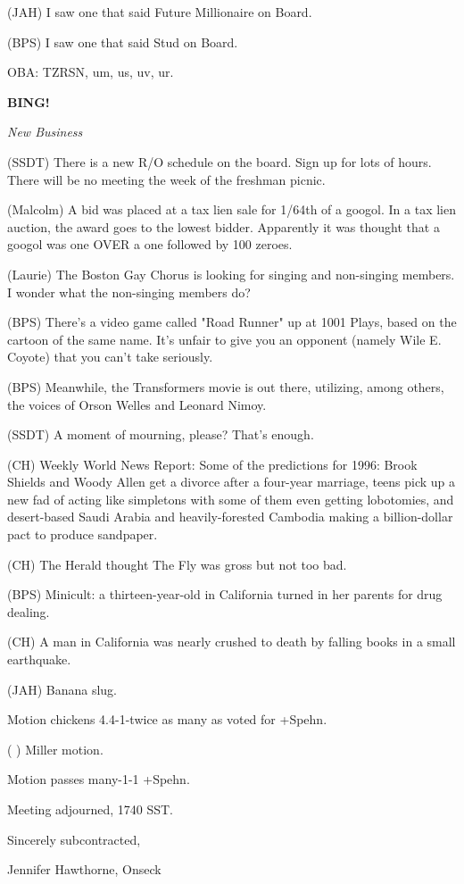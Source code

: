 \documentclass[12pt]{article}
\newcommand{\bing}{{\bf BING!} }
\newcommand{\goto}[1]{\bing \vskip 12pt \centerline{{\em{#1}}}}
\begin{document}
(JAH) I saw one that said Future Millionaire on Board.

(BPS) I saw one that said Stud on Board.

OBA: TZRSN, um, us, uv, ur.

\goto{New Business}

(SSDT) There is a new R/O schedule on the board. Sign up for lots of hours. There will be no meeting the week of the freshman picnic.

(Malcolm) A bid was placed at a tax lien sale for 1/64th of a googol. In a tax lien auction, the award goes to the lowest bidder. Apparently it was thought that a googol was one OVER a one followed by 100 zeroes.

(Laurie) The Boston Gay Chorus is looking for singing and non-singing members. I wonder what the non-singing members do?

(BPS) There's a video game called "Road Runner" up at 1001 Plays, based on the cartoon of the same name. It's unfair to give you an opponent (namely Wile E. Coyote) that you can't take seriously.

(BPS) Meanwhile, the Transformers movie is out there, utilizing, among others, the voices of Orson Welles and Leonard Nimoy.

(SSDT) A moment of mourning, please? That's enough.

(CH) Weekly World News Report: Some of the predictions for 1996: Brook Shields and Woody Allen get a divorce after a four-year marriage, teens pick up a new fad of acting like simpletons with some of them even getting lobotomies, and desert-based Saudi Arabia and heavily-forested Cambodia making a billion-dollar pact to produce sandpaper.

(CH) The Herald thought The Fly was gross but not too bad.

(BPS) Minicult: a thirteen-year-old in California turned in her parents for drug dealing.

(CH) A man in California was nearly crushed to death by falling books in a small earthquake.

(JAH) Banana slug.

Motion chickens 4.4-1-twice as many as voted for +Spehn.

( ) Miller motion.

Motion passes many-1-1 +Spehn.

\vspace{12pt}

\noindent
Meeting adjourned, 1740 SST.

\vspace{18pt}

\centerline{Sincerely subcontracted,}
\centerline{Jennifer Hawthorne, Onseck}
\end{document}
